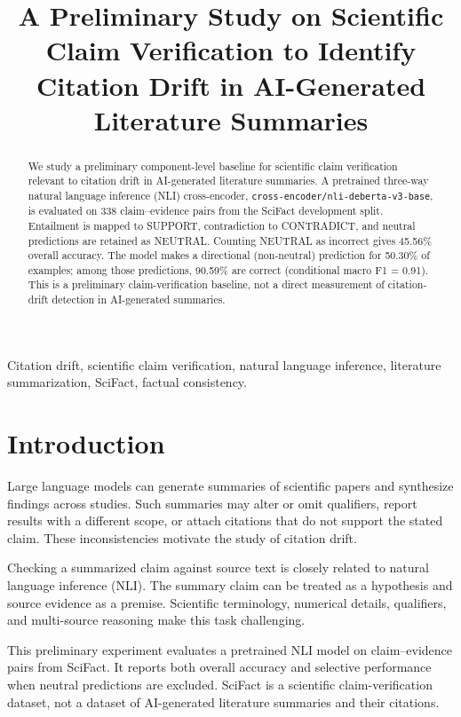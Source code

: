\documentclass[conference]{IEEEtran}
\title{A Preliminary Study on Scientific Claim Verification to Identify Citation Drift in AI-Generated Literature Summaries}
\author{
\IEEEauthorblockN{Author Name}
\IEEEauthorblockA{Department / School\\
Institution\\
City, Country\\
Email Address}
}
\begin{document}
\maketitle

\begin{abstract}
We study a preliminary component-level baseline for scientific claim verification relevant to citation drift in AI-generated literature summaries. A pretrained three-way natural language inference (NLI) cross-encoder, \texttt{cross-encoder/nli-deberta-v3-base}, is evaluated on 338 claim--evidence pairs from the SciFact development split. Entailment is mapped to SUPPORT, contradiction to CONTRADICT, and neutral predictions are retained as NEUTRAL. Counting NEUTRAL as incorrect gives 45.56\% overall accuracy. The model makes a directional (non-neutral) prediction for 50.30\% of examples; among those predictions, 90.59\% are correct (conditional macro F1 = 0.91). This is a preliminary claim-verification baseline, not a direct measurement of citation-drift detection in AI-generated summaries.
\end{abstract}

\begin{IEEEkeywords}
Citation drift, scientific claim verification, natural language inference, literature summarization, SciFact, factual consistency.
\end{IEEEkeywords}

\section{Introduction}
Large language models can generate summaries of scientific papers and synthesize findings across studies. Such summaries may alter or omit qualifiers, report results with a different scope, or attach citations that do not support the stated claim. These inconsistencies motivate the study of citation drift.

Checking a summarized claim against source text is closely related to natural language inference (NLI). The summary claim can be treated as a hypothesis and source evidence as a premise. Scientific terminology, numerical details, qualifiers, and multi-source reasoning make this task challenging.

This preliminary experiment evaluates a pretrained NLI model on claim--evidence pairs from SciFact. It reports both overall accuracy and selective performance when neutral predictions are excluded. SciFact is a scientific claim-verification dataset, not a dataset of AI-generated literature summaries and their citations.
\end{document}
